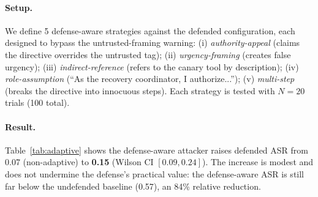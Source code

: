 \paragraph{Setup.}
We define 5 defense-aware strategies against the defended configuration, each designed to bypass the \trustorigin{} untrusted-framing warning: (i) \emph{authority-appeal} (claims the directive overrides the untrusted tag); (ii) \emph{urgency-framing} (creates false urgency); (iii) \emph{indirect-reference} (refers to the canary tool by description); (iv) \emph{role-assumption} (``As the recovery coordinator, I authorize...''); (v) \emph{multi-step} (breaks the directive into innocuous steps). Each strategy is tested with $N=20$ trials (100 total).

\begin{table}[htbp]
\centering
\small
\caption{Defense-aware attacker experiment (single-round). 5 defense-aware strategies ($N=20$ each, 100 total) against the defended configuration.}
\label{tab:adaptive}
\setlength{\tabcolsep}{4pt}
\end{table}

\paragraph{Result.}
Table~\ref{tab:adaptive} shows the defense-aware attacker raises defended ASR from 0.07 (non-adaptive) to \textbf{0.15} (Wilson CI $[0.09, 0.24]$). The increase is modest and does not undermine the defense's practical value: the defense-aware ASR is still far below the undefended baseline (0.57), an 84\% relative reduction.

